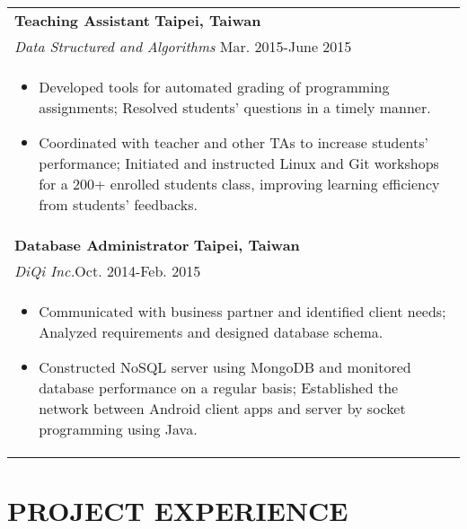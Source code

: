 \documentclass[a4paper,10pt]{article} %
\begin{document}
{\begin{tabular}{p{18.5cm}}
{\fontsize{11}{13.2}\textbf{Teaching Assistant}} \hfill \textbf{Taipei, Taiwan}\\
{\it Data Structured and Algorithms} \hfill  Mar. 2015-June 2015 \\%
\begin{itemize}
\vspace{-2mm}
\item Developed tools for automated grading of programming assignments; Resolved students' questions in a timely manner.
\item Coordinated with teacher and other TAs to increase students' performance; Initiated and instructed Linux and Git workshops for a 200+ enrolled students class, improving learning efficiency from students' feedbacks.\vspace*{-\baselineskip}
\end{itemize} \\ 
\vspace{0.5mm}

{\fontsize{11}{13.2}\textbf{Database Administrator}} \hfill \textbf{Taipei, Taiwan}\\ 
{\it DiQi Inc.}\hfill  Oct. 2014-Feb. 2015  \\%
\begin{itemize}
\vspace{-2mm}
\item Communicated with business partner and identified client needs; Analyzed requirements and designed database schema.
\item Constructed NoSQL server using MongoDB and monitored database performance on a regular basis; Established the network between Android client apps and server by socket programming using Java. \vspace*{-\baselineskip}
\end{itemize}\\
\end{tabular}


\section{\textbf{PROJECT EXPERIENCE}}
\begin{tabular}{p{18.5cm}}


\end{tabular}}
\end{document}

